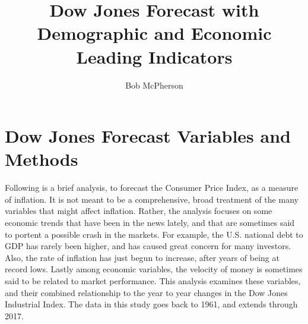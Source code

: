 \documentclass[12pt]{article}         %
\title{Dow Jones Forecast with Demographic and Economic Leading Indicators}  %
\author{Bob McPherson}          %
\begin{document}




\maketitle              %

\section{Dow Jones Forecast Variables and Methods}

Following is a brief analysis, to forecast the Consumer Price Index, as a measure of inflation.  It is not meant to be a comprehensive, broad treatment of the many variables that might affect inflation.  Rather, the analysis focuses on some economic trends that have been in the news lately, and that are sometimes said to portent a possible crash in the markets.  For example, the U.S. national debt to GDP has rarely been higher, and has caused great concern for many investors.  Also, the rate of inflation has just begun to increase, after years of being at record lows.  Lastly among economic variables, the velocity of money is sometimes said to be related to market performance.  This analysis examines these variables, and their combined relationship to the year to year changes in the Dow Jones Industrial Index.  The data in this study goes back to 1961, and extends through 2017.
\end{document}
